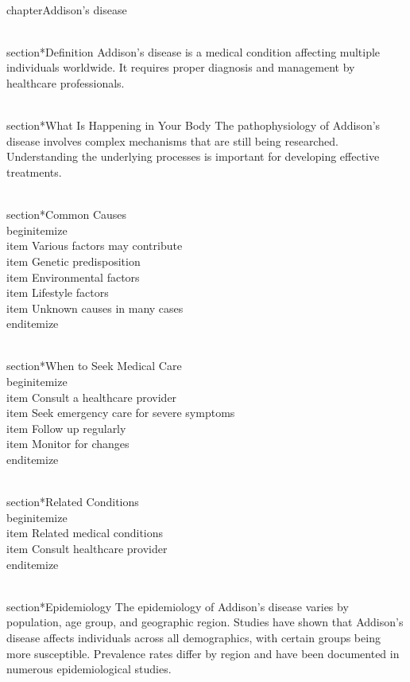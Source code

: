 
\\chapter{Addison's disease}

\\section*{Definition}
Addison's disease is a medical condition affecting multiple individuals worldwide. It requires proper diagnosis and management by healthcare professionals.

\\section*{What Is Happening in Your Body}
The pathophysiology of Addison's disease involves complex mechanisms that are still being researched. Understanding the underlying processes is important for developing effective treatments.

\\section*{Common Causes}
\\begin{itemize}
\\item Various factors may contribute\n  \\item Genetic predisposition\n  \\item Environmental factors\n  \\item Lifestyle factors\n  \\item Unknown causes in many cases
\\end{itemize}

\\section*{When to Seek Medical Care}
\\begin{itemize}
\\item Consult a healthcare provider\n  \\item Seek emergency care for severe symptoms\n  \\item Follow up regularly\n  \\item Monitor for changes
\\end{itemize}

\\section*{Related Conditions}
\\begin{itemize}
\\item Related medical conditions\n  \\item Consult healthcare provider
\\end{itemize}

\\section*{Epidemiology}
The epidemiology of Addison's disease varies by population, age group, and geographic region. Studies have shown that Addison's disease affects individuals across all demographics, with certain groups being more susceptible. Prevalence rates differ by region and have been documented in numerous epidemiological studies.


